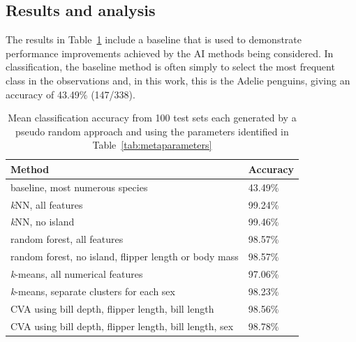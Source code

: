 \documentclass[12pt]{article}
\begin{document}
\subsection*{Results and analysis}

The results in Table~\ref{tab:results} include a baseline that is used to demonstrate performance improvements achieved by the AI methods being considered. 
In classification, the baseline method is often simply to select the most frequent class in the observations and, 
in this work, this is the Adelie penguins, giving an accuracy of 43.49\% (147/338).

\begin{table} %
  \small
  \begin{center}
  \vspace{0\baselineskip} %
  \setlength{\abovecaptionskip}{5pt}
  \setlength{\belowcaptionskip}{5pt}
  \fontsize{10}{10}\selectfont %
  \begin{tabular}{l|l}
  Method & Accuracy\\
  \hline
  baseline, most numerous species & 43.49\% \\
  \hline
  \textit{k}NN, all features	& 99.24\% \\
  \textit{k}NN, no island &	99.46\% \\
  \hline
  random forest, all features	& 98.57\% \\
  random forest, no island, flipper length or body mass	& 98.57\% \\
  \hline
  \textit{k}-means, all numerical features & 97.06\% \\
  \textit{k}-means, separate clusters for each sex & 98.23\% \\
  \hline
  CVA using bill depth, flipper length, bill length	& 98.56\% \\
  CVA using bill depth, flipper length, bill length, sex &98.78\% \\
  \hline
  \end{tabular}
  \vspace{-1.5\baselineskip} %
  \end{center} 
  \caption{Mean classification accuracy from 100 test sets each generated by a pseudo random approach 
  and using the parameters identified in Table~\ref{tab:metaparameters}}
  \vspace{-2\baselineskip} %
  \label{tab:results}
\end{table} 
\end{document}
